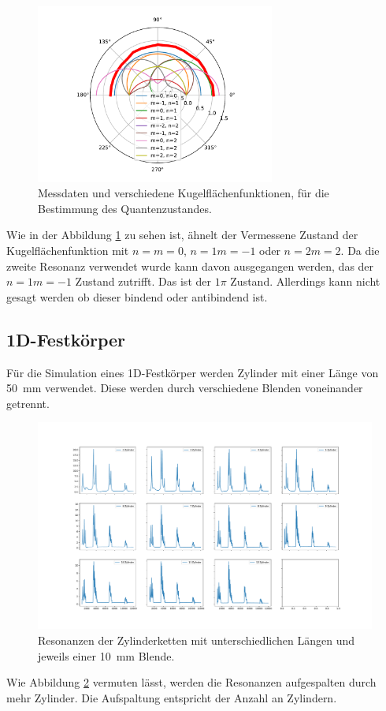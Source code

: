 \begin{figure}
    \centering
    \includegraphics[width = 0.7\textwidth, keepaspectratio]{figure/WMQZ.pdf}
    \caption{Messdaten und verschiedene Kugelflächenfunktionen, für die Bestimmung des Quantenzustandes.}
    \label{fig:WMQZ}
\end{figure}
\FloatBarrier
Wie in der Abbildung \ref{fig:WMQZ} zu sehen ist, ähnelt der Vermessene Zustand der Kugelflächenfunktion mit 
$n=m=0$, $n=1 m=-1$ oder $n=2 m=2$. Da die zweite Resonanz verwendet wurde kann davon ausgegangen werden, das der 
$n=1 m=-1$ Zustand zutrifft. Das ist der $1\pi$ Zustand. Allerdings kann nicht gesagt werden ob dieser bindend oder antibindend 
ist.
\subsection{1D-Festkörper}
Für die Simulation eines 1D-Festkörper werden Zylinder mit einer 
Länge von \SI{50}{\milli\meter} verwendet. Diese werden durch verschiedene Blenden voneinander getrennt.
\FloatBarrier
\begin{figure}
    \centering
    \includegraphics[width=\textwidth,keepaspectratio]{figure/Zylinder_Ketten.pdf}
    \caption{Resonanzen der Zylinderketten mit unterschiedlichen Längen und jeweils einer \SI{10}{\milli\meter} Blende.}
    \label{fig:Zylinder_Ketten}
\end{figure}
\FloatBarrier
Wie Abbildung \ref{fig:Zylinder_Ketten} vermuten lässt, werden die Resonanzen aufgespalten durch mehr Zylinder. Die 
Aufspaltung entspricht der Anzahl an Zylindern.

